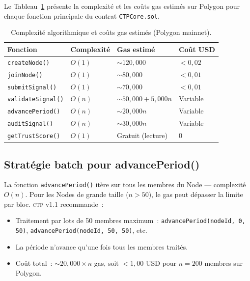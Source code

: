 \documentclass[12pt,a4paper]{article}
\theoremstyle{definition}
\theoremstyle{plain}
\theoremstyle{remark}
\newcommand{\CTP}{\textsc{ctp}}
\newcommand{\1}{\mathbf{1}}
\begin{document}
Le Tableau~\ref{tab:complexity} présente la complexité et les coûts gas
estimés sur Polygon pour chaque fonction principale du contrat
\texttt{CTPCore.sol}.

\begin{table}[h]
\centering
\caption{Complexité algorithmique et coûts gas estimés (Polygon mainnet).}
\label{tab:complexity}
\begin{tabular}{llll}
\toprule
\textbf{Fonction} & \textbf{Complexité} & \textbf{Gas estimé} & \textbf{Coût USD} \\
\midrule
\texttt{createNode()}      & $O(1)$    & $\sim 120{,}000$     & $< 0{,}02$ \\
\texttt{joinNode()}        & $O(1)$    & $\sim 80{,}000$      & $< 0{,}01$ \\
\texttt{submitSignal()}    & $O(1)$    & $\sim 70{,}000$      & $< 0{,}01$ \\
\texttt{validateSignal()}  & $O(n)$    & $\sim 50{,}000 + 5{,}000n$ & Variable \\
\texttt{advancePeriod()}   & $O(n)$    & $\sim 20{,}000n$     & Variable \\
\texttt{auditSignal()}     & $O(n)$    & $\sim 30{,}000n$     & Variable \\
\texttt{getTrustScore()}   & $O(1)$    & Gratuit (lecture)    & $0$ \\
\bottomrule
\end{tabular}
\end{table}

\subsection{Stratégie batch pour advancePeriod()}

La fonction \texttt{advancePeriod()} itère sur tous les membres du Node
--- complexité $O(n)$. Pour les Nodes de grande taille ($n > 50$),
le gas peut dépasser la limite par bloc. \CTP{} v1.1 recommande~:

\begin{itemize}
  \item Traitement par lots de 50 membres maximum~:
    \texttt{advancePeriod(nodeId, 0, 50)}, \texttt{advancePeriod(nodeId, 50, 50)}, etc.
  \item La période n'avance qu'une fois tous les membres traités.
  \item Coût total~: $\sim 20{,}000 \times n$ gas, soit $< 1{,}00$ USD
    pour $n = 200$ membres sur Polygon.
\end{itemize}
\end{document}
